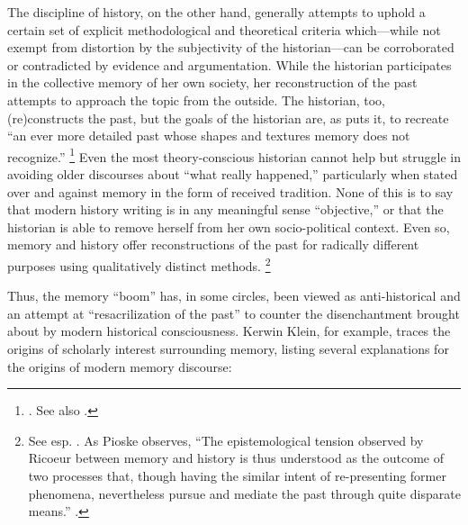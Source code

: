 The discipline of history, on the other hand, generally attempts to uphold a certain set of explicit methodological and theoretical criteria which---while not exempt from distortion by the subjectivity of the historian---can be corroborated or contradicted by evidence and argumentation.%
    \autocite[12--13]{pioske_bibint2015}
While the historian participates in the collective memory of her own society, her reconstruction of the past attempts to approach the topic from the outside. The historian, too, (re)constructs the past, but the goals of the historian are, as \yerushalmi puts it, to recreate ``an ever more detailed past whose shapes and textures memory does not recognize.''%
    \footnote{%
        \Cite[94]{yerushalmi1989}. See also
        \cite[532]{verovsek_pgi2016}.}
Even the most theory-conscious historian cannot help but struggle in avoiding older discourses about ``what really happened,'' particularly when stated over and against memory in the form of received tradition. None of this is to say that modern history writing is in any meaningful sense ``objective,'' or that the historian is able to remove herself from her own socio-political context. Even so, memory and history offer reconstructions of the past for radically different purposes using qualitatively distinct methods.%
    \footnote{See esp. 
        \cite[497]{ricoeur2004}. As Pioske observes, ``The epistemological tension observed by Ricoeur between memory and history is thus understood as the outcome of two processes that, though having the similar intent of re-presenting former phenomena, nevertheless pursue and mediate the past through quite disparate means.''
        \cite[12]{pioske_bibint2015}.}

Thus, the memory ``boom'' has, in some circles, been viewed as anti-historical and an attempt at ``resacrilization of the past'' to counter the disenchantment brought about by modern historical consciousness.%
    \autocite[282]{winter2006}
Kerwin Klein, for example, traces the origins of scholarly interest surrounding memory, listing several explanations for the origins of modern memory discourse:  

